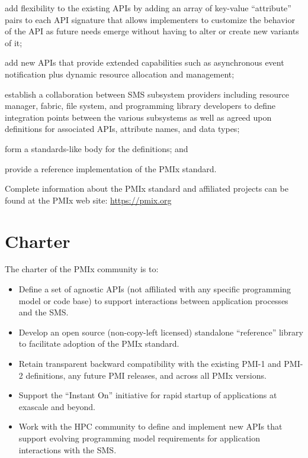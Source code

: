 \begin{compactalphaenum}
\item add flexibility to the existing \acp{API} by adding an array of key-value ``attribute'' pairs to each \ac{API} signature that allows implementers to customize the behavior of the \ac{API} as future needs emerge without having to alter or create new variants of it;

\item add new APIs that provide extended capabilities such as asynchronous event notification plus dynamic resource allocation and management;

\item establish a collaboration between \ac{SMS} subsystem providers including resource manager, fabric, file system, and programming library developers to define integration points between the various subsystems as well as agreed upon definitions for associated \acp{API}, attribute names, and data types;

\item form a standards-like body for the definitions; and

\item provide a reference implementation of the \ac{PMIx} standard.
\end{compactalphaenum}

Complete information about the \ac{PMIx} standard and affiliated projects can be found at the \ac{PMIx} web site: \url{https://pmix.org}


\section{Charter}
\label{chap:intro:charter}

The charter of the PMIx community is to:
\begin{itemize}
\item Define a set of agnostic APIs (not affiliated with any specific programming model or code base) to support interactions between application processes and the \ac{SMS}.
\item Develop an open source (non-copy-left licensed) standalone ``reference'' library to facilitate adoption of the \ac{PMIx} standard.
\item Retain transparent backward compatibility with the existing PMI-1 and PMI-2 definitions, any future \ac{PMI} releases, and across all \ac{PMIx} versions.
\item Support the ``Instant On'' initiative for rapid startup of applications at exascale and beyond.
\item Work with the \ac{HPC} community to define and implement new \acp{API} that support evolving programming model requirements for application interactions with the \ac{SMS}.
\end{itemize}

